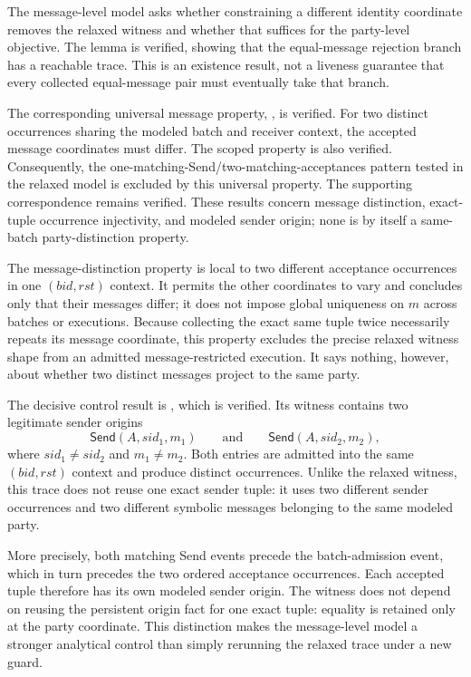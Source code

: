 The message-level model asks whether constraining a different identity
coordinate removes the relaxed witness and whether that suffices for the
party-level objective. The lemma
 is verified, showing
that the equal-message rejection branch has a reachable trace. This is an
existence result, not a liveness guarantee that every collected equal-message
pair must eventually take that branch.

The corresponding universal message property,
, is verified.
For two distinct \receiveraccept occurrences sharing the modeled batch and
receiver context, the accepted message coordinates must differ. The scoped
 property is also verified.
Consequently, the one-matching-Send/two-matching-acceptances pattern tested in
the relaxed model is excluded by this universal property. The supporting
 correspondence remains verified.
These results concern message distinction, exact-tuple occurrence
injectivity, and modeled sender origin; none is by itself a same-batch party-distinction
property.

The message-distinction property is local to two different acceptance
occurrences in one \((\mathit{bid},\mathit{rst})\) context. It permits the
other coordinates to vary and concludes only that their messages differ; it
does not impose global uniqueness on $m$ across batches or executions.
Because collecting the exact same tuple twice necessarily repeats its message
coordinate, this property excludes the precise relaxed witness shape from an
admitted message-restricted execution. It says nothing, however, about whether
two distinct messages project to the same party.

The decisive control result is
, which is verified.
Its witness contains two legitimate sender origins
\[
  \mathsf{Send}(A,\mathit{sid}_1,m_1)
  \qquad\text{and}\qquad
  \mathsf{Send}(A,\mathit{sid}_2,m_2),
\]
where \(\mathit{sid}_1\neq\mathit{sid}_2\) and \(m_1\neq m_2\). Both entries
are admitted into the same \((\mathit{bid},\mathit{rst})\) context and produce
distinct \receiveraccept occurrences. Unlike the relaxed witness, this trace
does not reuse one exact sender tuple: it uses two different sender
occurrences and two different symbolic messages belonging to the same modeled
party.

More precisely, both matching Send events precede the batch-admission event,
which in turn precedes the two ordered acceptance occurrences. Each accepted
tuple therefore has its own modeled sender origin. The witness does not depend
on reusing the persistent origin fact for one exact tuple: equality is retained
only at the party coordinate. This distinction makes the message-level model
a stronger analytical control than simply rerunning the relaxed trace under a
new guard.


